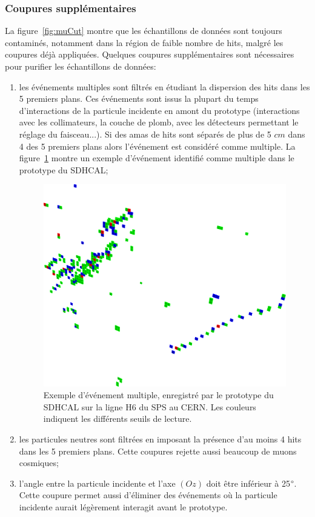 \subsubsection{Coupures supplémentaires}
La figure~\ref{fig:muCut} montre que les échantillons de données sont toujours contaminés, notamment dans la région de faible nombre de hits, malgré les coupures déjà appliquées. Quelques coupures supplémentaires sont nécessaires pour purifier les échantillons de données:
\begin{enumerate}[-]
\item les événements multiples sont filtrés en étudiant la dispersion des hits dans les 5 premiers plans. Ces événements sont issus la plupart du temps d’interactions de la particule incidente en amont du prototype (interactions avec les collimateurs, la couche de plomb, avec les détecteurs permettant le réglage du faisceau...). Si des amas de hits sont séparés de plus de 5 $cm$ dans 4 des 5 premiers plans alors l'événement est considéré comme multiple. La figure~\ref{fig:multiple} montre un exemple d'événement identifié comme multiple dans le prototype du SDHCAL;
  \begin{figure}[!ht]
    \begin{center}
      \includegraphics[width=.5\textwidth]{SDHCAL/figs/multiple.png}
      \caption{Exemple d'événement multiple, enregistré par le prototype du SDHCAL sur la ligne H6 du SPS au CERN. Les couleurs indiquent les différents seuils de lecture.}
      \label{fig:multiple}
    \end{center}
  \end{figure}
\item les particules neutres sont filtrées en imposant la présence d'au moins 4 hits dans les 5 premiers plans. Cette coupures rejette aussi beaucoup de muons cosmiques;
\item l'angle entre la particule incidente et l'axe $(Oz)$ doit être inférieur à 25$\degree$. Cette coupure permet aussi d'éliminer des événements où la particule incidente aurait légèrement interagit avant le prototype.
\end{enumerate}
